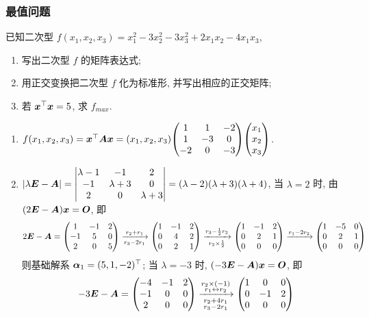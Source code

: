 \subsubsection{最值问题}

\begin{example}
    已知二次型 $f(x_1,x_2,x_3)=x_1^2-3x_2^2-3x_3^2+2x_1x_2-4x_1x_3$,
    \begin{enumerate}[label=(\arabic{*})]
        \item 写出二次型 $f$ 的矩阵表达式;
        \item 用正交变换把二次型 $f$ 化为标准形, 并写出相应的正交矩阵;
        \item 若 $\vb*{x}^\top\vb*{x}=5$, 求 $f_{max}.$
    \end{enumerate}
\end{example}
\begin{solution}
    \begin{enumerate}[label=(\arabic{*})]
        \item $f(x_1,x_2,x_3)=\vb*{x}^\top\vb*{Ax}=(x_1,x_2,x_3)\mqty(1&1&-2\\1&-3&0\\-2&0&-3)\mqty(x_1\\x_2\\x_3)$.
        \item $|\lambda\vb*{E}-\vb*{A}|=\mqty|\lambda-1&-1&2\\-1&\lambda+3&0\\2&0&\lambda+3|=(\lambda-2)(\lambda+3)(\lambda+4)$, 当 $\lambda=2$ 时, 由 $(2\vb*{E}-\vb*{A})\vb*{x}=\vb*{O}$, 即
              $$2\vb*{E}-\vb*{A}=\mqty(1&-1&2\\-1&5&0\\2&0&5)\xrightarrow[r_3-2r_1]{r_2+r_1}\mqty(1&-1&2\\0&4&2\\0&2&1)\xrightarrow[r_2\times\frac{1}{2}]{r_3-\frac{1}{2}r_2}\mqty(1&-1&2\\0&2&1\\0&0&0)\xrightarrow{r_1-2r_2}\mqty(1&-5&0\\0&2&1\\0&0&0)$$
              则基础解系 $\vb*{\alpha}_1=(5,1,-2)^\top$; 当 $\lambda=-3$ 时, $(-3\vb*{E}-\vb*{A})\vb*{x}=\vb*{O}$, 即
              $$-3\vb*{E}-\vb*{A}=\mqty(-4&-1&2\\-1&0&0\\2&0&0)\xrightarrow[\substack{r_2+4r_1\\r_3-2r_1}]{\substack{r_2\times(-1)\\r_1\leftrightarrow r_2}}\mqty(1&0&0\\0&-1&2\\0&0&0)$$

\end{enumerate}
\end{solution}
